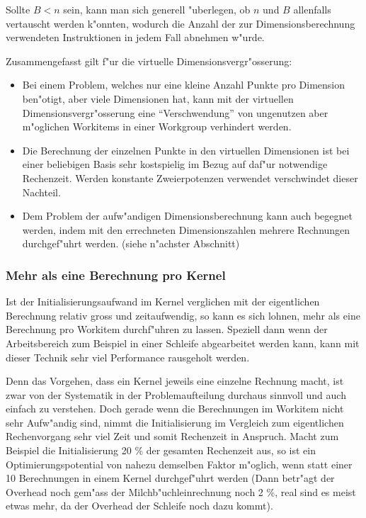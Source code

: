 \begin{refsection}
Sollte $ B < n $ sein, kann man sich generell "uberlegen, ob $ n $ und $ B $ 
allenfalls vertauscht werden k"onnten, wodurch die Anzahl der zur Dimensionsberechnung
verwendeten Instruktionen in jedem Fall abnehmen w"urde.

Zusammengefasst gilt f"ur die virtuelle Dimensionsvergr"osserung:

\begin{itemize}
 \item Bei einem Problem, welches nur eine kleine Anzahl Punkte pro 
       Dimension ben"otigt, aber viele Dimensionen hat, kann mit der
       virtuellen Dimensionsvergr"osserung eine ``Verschwendung'' von
       ungenutzen aber m"oglichen Workitems in einer Workgroup verhindert 
       werden.
 \item Die Berechnung der einzelnen Punkte in den virtuellen 
       Dimensionen ist bei einer beliebigen Basis sehr kostspielig im Bezug 
       auf daf"ur notwendige Rechenzeit. Werden konstante Zweierpotenzen
       verwendet verschwindet dieser Nachteil.
 \item Dem Problem der aufw"andigen Dimensionsberechnung kann auch begegnet 
       werden, indem mit den errechneten Dimensionszahlen
       mehrere Rechnungen durchgef"uhrt werden. (siehe n"achster Abschnitt)
\end{itemize}


\subsubsection{Mehr als eine Berechnung pro Kernel}

Ist der Initialisierungsaufwand im Kernel verglichen mit der eigentlichen
Berechnung relativ gross und zeitaufwendig, so kann es sich lohnen, mehr als 
eine Berechnung pro Workitem durchf"uhren zu lassen. Speziell dann wenn der 
Arbeitsbereich zum Beispiel in einer Schleife abgearbeitet werden kann, kann
mit dieser Technik sehr viel Performance rausgeholt werden.

Denn das Vorgehen, dass ein Kernel jeweils eine einzelne Rechnung macht, 
ist zwar von der Systematik in der Problemaufteilung durchaus sinnvoll 
und auch einfach zu verstehen. Doch gerade wenn die Berechnungen im Workitem
nicht sehr Aufw"andig sind, nimmt die Initialisierung im Vergleich zum eigentlichen
Rechenvorgang sehr viel Zeit und somit Rechenzeit in Anspruch. Macht zum Beispiel 
die Initialisierung 20 \% der gesamten Rechenzeit aus, so ist ein 
Optimierungspotential von nahezu demselben Faktor m"oglich, wenn statt einer 10 Berechnungen 
in einem Kernel durchgef"uhrt werden (Dann betr"agt der Overhead noch gem"ass der 
Milchb"uchleinrechnung noch 2 \%, real sind es meist etwas mehr, da der Overhead der 
Schleife noch dazu kommt). 


\end{refsection}
